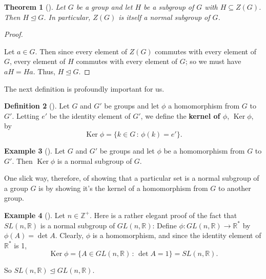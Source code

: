 \documentclass[10pt,]{book}
\newcommand{\terminology}[1]{\textbf{#1}}
\theoremstyle{plain}
\newtheorem{theorem}{Theorem}[section]
\theoremstyle{definition}
\newtheorem{definition}[theorem]{Definition}
\theoremstyle{definition}
\theoremstyle{definition}
\newtheorem{example}[theorem]{Example}
\theoremstyle{definition}
\numberwithin{equation}{section}
\def\Z{\mathbb{Z}}
\def\R{\mathbb{R}}
\DeclareMathOperator{\Ker}{Ker}
\begin{document}
\begin{theorem}[{}]\label{znorm}
Let \(G\) be a group and let \(H\) be a subgroup of \(G\) with \(H\subseteq Z(G)\). Then \(H\unlhd G\). In particular, \(Z(G)\) is itself a normal subgroup of \(G\).%
\end{theorem}
\begin{proof}\hypertarget{proof-44}{}
Let \(a\in G\). Then since every element of \(Z(G)\) commutes with every element of \(G\), every element of \(H\) commutes with every element of \(G\); so we must have \(aH=Ha\). Thus, \(H\unlhd G\).%
\end{proof}
The next definition is profoundly important for us.%
\begin{definition}[{}]\label{definition-65}
Let \(G\) and \(G'\) be groups and let \(\phi\) a homomorphism from \(G\) to \(G'\). Letting \(e'\) be the identity element of \(G'\), we define the \terminology{kernel of \(\phi\)}, \(\Ker
\phi\), by%
\begin{equation*}
\Ker \phi = \{k\in G\,:\,\phi(k)=e'\}.
\end{equation*}
%
\end{definition}
\begin{example}[]\label{example-79}
Let \(G\) and \(G'\) be groups and let \(\phi\) be a homomorphism from \(G\) to \(G'\). Then \(\Ker \phi\) is a normal subgroup of \(G\).%
\end{example}
One slick way, therefore, of showing that a particular set is a normal subgroup of a group \(G\) is by showing it's the kernel of a homomorphism from \(G\) to another group.%
\begin{example}[]\label{slnormgl}
Let \(n\in \Z^+\). Here is a rather elegant proof of the fact that \(SL(n,\R)\) is a normal subgroup of \(GL(n,\R)\): Define \(\phi:
GL(n,\R) \to \R^*\) by \(\phi(A)=\det A\). Clearly, \(\phi\) is a homomorphism, and since the identity element of \(\R^*\) is 1,%
\begin{equation*}
\Ker \phi=\{A\in GL(n,\R)\,:\,\det A= 1\}=SL(n,\R).
\end{equation*}
%
\par
So \(SL(n,\R)\unlhd GL(n,\R)\).%
\end{example}
\typeout{************************************************}
\typeout{************************************************}
\end{document}
